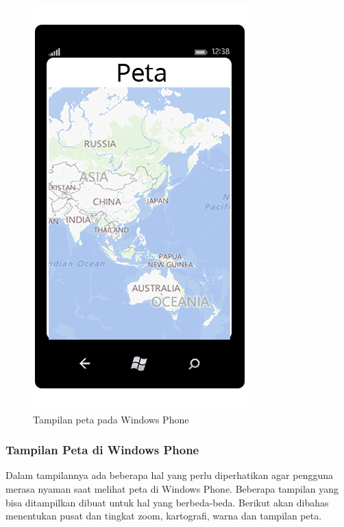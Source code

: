 \clearpage

\begin{figure}[h]
	\centering
		\includegraphics[scale=0.1]{Gambar/map}
	\caption{Tampilan peta pada Windows Phone}
	\label{fig:peta}
\end{figure}

\subsubsection{Tampilan Peta di Windows Phone}
\label{subsubsec:Tampilan Peta di Windows Phone}
\hspace{0.5cm} Dalam tampilannya ada beberapa hal yang perlu diperhatikan agar pengguna merasa nyaman saat melihat peta di Windows Phone. Beberapa tampilan yang bisa ditampilkan dibuat untuk hal yang berbeda-beda. Berikut akan dibahas menentukan pusat dan tingkat zoom, kartografi, warna dan tampilan peta.

